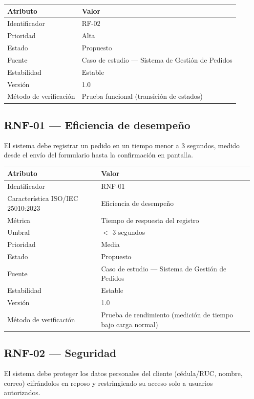 \documentclass[11pt]{article}
\newcommand{\atributotabla}[1]{%
\begin{center}
\begin{tabular}{|p{4cm}|p{9cm}|}
\hline
\textbf{Atributo} & \textbf{Valor} \\
\hline
#1
\hline
\end{tabular}
\end{center}
}
\begin{document}
\atributotabla{
Identificador & RF-02 \\
\hline
Prioridad & Alta \\
\hline
Estado & Propuesto \\
\hline
Fuente & Caso de estudio --- Sistema de Gestión de Pedidos \\
\hline
Estabilidad & Estable \\
\hline
Versión & 1.0 \\
\hline
Método de verificación & Prueba funcional (transición de estados) \\
}

\subsection*{RNF-01 --- Eficiencia de desempeño}
El sistema debe registrar un pedido en un tiempo menor a 3 segundos, medido desde el envío del formulario hasta la confirmación en pantalla.

\begin{center}
\begin{tabular}{|p{4cm}|p{9cm}|}
\hline
\textbf{Atributo} & \textbf{Valor} \\
\hline
Identificador & RNF-01 \\
\hline
Característica ISO/IEC 25010:2023 & Eficiencia de desempeño \\
\hline
Métrica & Tiempo de respuesta del registro \\
\hline
Umbral & $<$ 3 segundos \\
\hline
Prioridad & Media \\
\hline
Estado & Propuesto \\
\hline
Fuente & Caso de estudio --- Sistema de Gestión de Pedidos \\
\hline
Estabilidad & Estable \\
\hline
Versión & 1.0 \\
\hline
Método de verificación & Prueba de rendimiento (medición de tiempo bajo carga normal) \\
\hline
\end{tabular}
\end{center}

\subsection*{RNF-02 --- Seguridad}
El sistema debe proteger los datos personales del cliente (cédula/RUC, nombre, correo) cifrándolos en reposo y restringiendo su acceso solo a usuarios autorizados.
\end{document}
